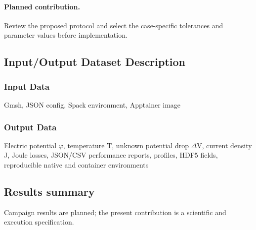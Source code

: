 \paragraph{Planned contribution.} Review the proposed protocol and select the case-specific tolerances and parameter values before implementation.

\subsection{Input/Output Dataset Description}

\subsubsection{Input Data}
Gmsh, JSON config, Spack environment, Apptainer image

\subsubsection{Output Data}
Electric potential $\varphi$, temperature T, unknown potential drop $\Delta$V, current density J, Joule losses, JSON/CSV performance reports, profiles, HDF5 fields, reproducible native and container environments

\subsection{Results summary}
Campaign results are planned; the present contribution is a scientific and execution specification.


